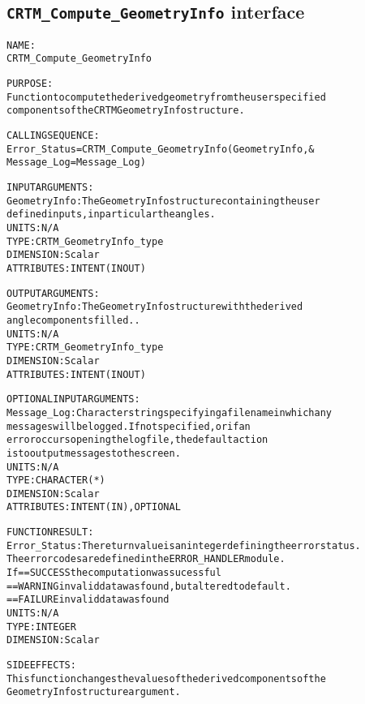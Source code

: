 \subsection{\texttt{CRTM\_Compute\_GeometryInfo} interface}
  \label{sec:CRTM_Compute_GeometryInfo_interface}
  \begin{alltt}
 
  NAME:
        CRTM_Compute_GeometryInfo
  
  PURPOSE:
        Function to compute the derived geometry from the user specified
        components of the CRTM GeometryInfo structure.
 
  CALLING SEQUENCE:
        Error_Status = CRTM_Compute_GeometryInfo( GeometryInfo           , &
                                                  Message_Log=Message_Log  )
 
  INPUT ARGUMENTS:
        GeometryInfo:  The GeometryInfo structure containing the user
                       defined inputs, in particular the angles.
                       UNITS:      N/A
                       TYPE:       CRTM_GeometryInfo_type
                       DIMENSION:  Scalar
                       ATTRIBUTES: INTENT(IN OUT)
 
  OUTPUT ARGUMENTS:
        GeometryInfo:  The GeometryInfo structure with the derived
                       angle components filled..
                       UNITS:      N/A
                       TYPE:       CRTM_GeometryInfo_type
                       DIMENSION:  Scalar
                       ATTRIBUTES: INTENT(IN OUT)
 
  OPTIONAL INPUT ARGUMENTS:
        Message_Log:   Character string specifying a filename in which any
                       messages will be logged. If not specified, or if an
                       error occurs opening the log file, the default action
                       is to output messages to the screen.
                       UNITS:      N/A
                       TYPE:       CHARACTER( * )
                       DIMENSION:  Scalar
                       ATTRIBUTES: INTENT( IN ), OPTIONAL
 
  FUNCTION RESULT:
        Error_Status:   The return value is an integer defining the error status.
                        The error codes are defined in the ERROR_HANDLER module.
                        If == SUCCESS the computation was sucessful
                           == WARNING invalid data was found, but altered to default.
                           == FAILURE invalid data was found
                        UNITS:      N/A
                        TYPE:       INTEGER
                        DIMENSION:  Scalar
 
  SIDE EFFECTS:
        This function changes the values of the derived components of the
        GeometryInfo structure argument.
 
  \end{alltt}
